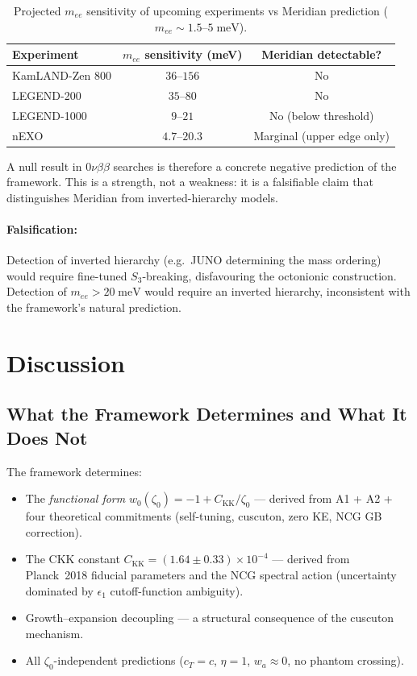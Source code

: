 \begin{table}[htbp]
\centering
\small
\caption{Projected $m_{ee}$ sensitivity of upcoming experiments vs Meridian prediction ($m_{ee} \sim 1.5$--$5\;\mathrm{meV}$).}
\label{tab:2-mee-experiments}
\begin{tabular}{@{}lcc@{}}
\toprule
Experiment & $m_{ee}$ sensitivity (meV) & Meridian detectable? \\
\midrule
KamLAND-Zen 800 & $36$--$156$ & No \\
LEGEND-200 & $35$--$80$ & No \\
LEGEND-1000 & $9$--$21$ & No (below threshold) \\
nEXO & $4.7$--$20.3$ & Marginal (upper edge only) \\
\bottomrule
\end{tabular}
\end{table}

\noindent
A null result in $0\nu\beta\beta$ searches is therefore a concrete negative prediction of the framework. This is a strength, not a weakness: it is a falsifiable claim that distinguishes Meridian from inverted-hierarchy models.

\paragraph{Falsification:} Detection of inverted hierarchy (e.g.\ JUNO determining the mass ordering) would require fine-tuned $S_3$-breaking, disfavouring the octonionic construction. Detection of $m_{ee} > 20\;\mathrm{meV}$ would require an inverted hierarchy, inconsistent with the framework's natural prediction.

\section{Discussion}
\label{sec:2-discussion}

\subsection{What the Framework Determines and What It Does Not}
\label{sec:2-determines}

The framework determines:
\begin{itemize}
    \item The \emph{functional form} $w_0(\zeta_0) = -1 + C_\mathrm{KK}/\zeta_0$ --- derived from A1 + A2 + four theoretical commitments (self-tuning, cuscuton, zero KE, NCG GB correction).
    \item The CKK constant $C_\mathrm{KK} = (1.64 \pm 0.33) \times 10^{-4}$ --- derived from Planck~2018 fiducial parameters and the NCG spectral action (uncertainty dominated by $\epsilon_1$ cutoff-function ambiguity).
    \item Growth--expansion decoupling --- a structural consequence of the cuscuton mechanism.
    \item All $\zeta_0$-independent predictions ($c_T = c$, $\eta = 1$, $w_a \approx 0$, no phantom crossing).
\end{itemize}

